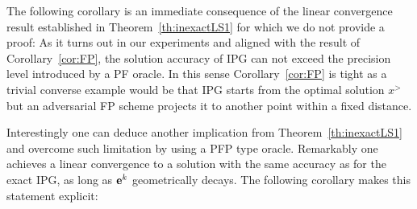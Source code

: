 {}

The following corollary is an immediate consequence of the linear convergence result established in Theorem~\ref{th:inexactLS1} for which we do not provide a proof:
{}
As it turns out in our experiments and aligned with the result of Corollary~\ref{cor:FP}, the solution accuracy of IPG can not exceed the precision level introduced by a PF oracle. In this sense Corollary~\ref{cor:FP} is tight as a trivial converse example would be that IPG starts from the optimal solution $x^\gt$ but an adversarial FP scheme projects it to another point within a fixed distance. 

Interestingly one can deduce another implication from  Theorem~\ref{th:inexactLS1} and overcome such limitation by  using a PFP type oracle.
Remarkably 
one achieves a linear convergence to a solution with the same accuracy as for the exact IPG, 
as long as $\mathbf{e}^k$ geometrically decays. 	
The following corollary makes this statement explicit:
	
	
